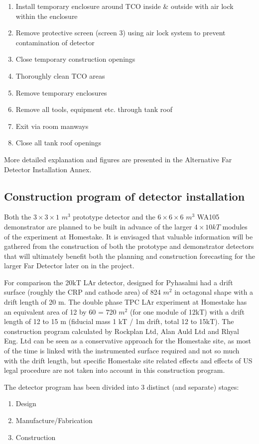 \begin{enumerate}
\item{Install temporary enclosure around TCO inside \& outside with air lock within the enclosure}
\item{ Remove protective screen (screen 3) using air lock system to prevent contamination of detector}
\item{Close temporary construction openings}
\item{Thoroughly clean TCO areas}
\item{Remove temporary enclosures}
\item{Remove all tools, equipment etc. through tank roof}
\item{Exit via room manways}
\item{Close all tank roof openings}
\end{enumerate}

More detailed explanation and figures are presented in the Alternative Far Detector Installation Annex.
\subsection{Construction program of detector installation}


Both the $3\times3\times1$ $m^3$ prototype detector and the $6\times 6\times 6$ $m^3$  WA105 demonstrator are planned to be built in advance of the larger $4\times 10kT$ modules of the experiment at Homestake.  It is envisaged that valuable information will be gathered from the construction of both the prototype and demonstrator detectors that will ultimately benefit both the planning and construction forecasting for the larger Far Detector later on in the project.

For comparison the 20kT LAr detector, designed for Pyhasalmi had a drift surface (roughly the CRP and cathode area) of 824 $m^2$ in octagonal shape with a drift length of 20 m. The double phase TPC LAr experiment at Homestake has an equivalent area of 12 by 60 = 720 $m^2$ (for one module of 12kT) with a drift length of 12 to 15 m (fiducial mass 1 kT / 1m drift, total 12 to 15kT). The construction program calculated by Rockplan Ltd, Alan Auld Ltd and Rhyal Eng. Ltd can be seen as a conservative approach for the Homestake site, as most of the time is linked with the instrumented surface required and not so much with the drift length, but specific Homestake site related effects and effects of US legal procedure are not taken into account in this construction program.

The detector program has been divided into 3 distinct (and separate) stages:
\begin{enumerate}
\item{Design}
\item{Manufacture/Fabrication} 
\item{Construction}
\end{enumerate}  

